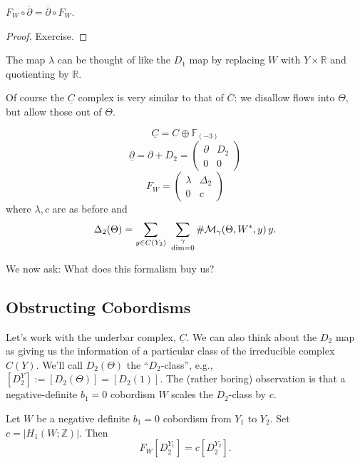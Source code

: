 \documentclass[main]{subfiles}
\begin{document}
\begin{proposition}
$F_W\circ\overline{\partial} = \overline{\partial}\circ F_W$.
\end{proposition}

\begin{proof}
Exercise.
\end{proof}

\begin{remark}
The map $\lambda$ can be thought of like the $D_1$ map by replacing $W$ with $Y\times\mathbb{R}$ and quotienting by $\mathbb{R}$.
\end{remark}

Of course the $\underline{C}$ complex is very similar to that of $\overline{C}$: we disallow flows into $\Theta$, but allow those out of $\Theta$.

\begin{definition}
\[
\underline{C} = C\oplus\mathbb{F}_{(-3)}
\]
\[
\underline{\partial} = \partial+D_2 = \begin{pmatrix}\partial & D_2\\ 0 & 0\end{pmatrix}
\]
\[
F_W = \begin{pmatrix}\lambda & \Delta_2\\ 0 & c\end{pmatrix}
\]
where $\lambda, c$ are as before and
\[
\Delta_2(\Theta) = \sum_{y\in C(Y_2)}\ \sum_{\substack{\gamma \\ \dim=0}} \#\mathcal{M}_\gamma(\Theta,W^\ast,y)\, y.
\]
\end{definition}

We now ask: What does this formalism buy us?

\subsection*{Obstructing Cobordisms}

Let's work with the underbar complex, $\underline{C}$. We can also think about the $D_2$ map as giving us the information of a particular class of the irreducible complex $C(Y)$. We'll call $D_2(\Theta)$ the ``$D_2$-class'', e.g., $[D_2^Y]:=[D_2(\Theta)]=[D_2(1)]$. The (rather boring) observation is that a negative-definite $b_1=0$ cobordism $W$ scales the $D_2$-class by $c$.

\begin{theorem}
Let $W$ be a negative definite $b_1=0$ cobordism from $Y_1$ to $Y_2$. Set $c=|H_1(W;\mathbb{Z})|$. Then
\[
F_W[D_2^{Y_1}] = c[D_2^{Y_2}].
\]
\end{theorem}
\end{document}
